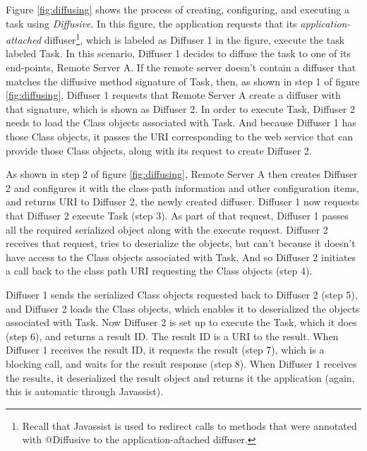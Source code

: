 \documentclass[11pt]{article}
\begin{document}
Figure \ref{fig:diffusing} shows the process of creating, configuring, and executing a task using \emph{Diffusive}. In this figure, the application requests that its \emph{application-attached} diffuser\footnote{Recall that Javassist is used to redirect calls to methods that were annotated with \textsf{@Diffusive} to the application-aftached diffuser.}, which is labeled as \textsf{Diffuser 1} in the figure, execute the task labeled \textsf{Task}. In this scenario, \textsf{Diffuser 1} decides to diffuse the task to one of its end-points, \textsf{Remote Server A}. If the remote server doesn't contain a diffuser that matches the diffusive method signature of \textsf{Task}, then, as shown in step 1 of figure \ref{fig:diffusing}, \textsf{Diffuser 1} requests that \textsf{Remote Server A} create a diffuser with that signature, which is shown as \textsf{Diffuser 2}. In order to execute \textsf{Task}, \textsf{Diffuser 2} needs to load the \textsf{Class} objects associated with \textsf{Task}. And because \textsf{Diffuser 1} has those \textsf{Class} objects, it passes the URI corresponding to the web service that can provide those \textsf{Class} objects, along with its request to create \textsf{Diffuser 2}.

As shown in step 2 of figure \ref{fig:diffusing}, \textsf{Remote Server A} then creates \textsf{Diffuser 2} and configures it with the class path information and other configuration items, and returns URI to \textsf{Diffuser 2}, the newly created diffuser. \textsf{Diffuser 1} now requests that \textsf{Diffuser 2} execute \textsf{Task} (step 3). As part of that request, \textsf{Diffuser 1} passes all the required serialized object along with the execute request. \textsf{Diffuser 2} receives that request, tries to deserialize the objects, but can't because it doesn't have access to the \textsf{Class} objects associated with \textsf{Task}. And so \textsf{Diffuser 2} initiates a call back to the class path URI requesting the \textsf{Class} objects (step 4).

\textsf{Diffuser 1} sends the serialized \textsf{Class} objects requested back to \textsf{Diffuser 2} (step 5), and \textsf{Diffuser 2} loads the \textsf{Class} objects, which enables it to deserialized the objects associated with \textsf{Task}. Now \textsf{Diffuser 2} is set up to execute the \textsf{Task}, which it does (step 6), and returns a result ID. The result ID is a URI to the result. When \textsf{Diffuser 1} receives the result ID, it requests the result (step 7), which is a blocking call, and waits for the result response (step 8). When \textsf{Diffuser 1} receives the results, it deserialized the result object and returns it the application (again, this is automatic through Javassist).
\end{document}
